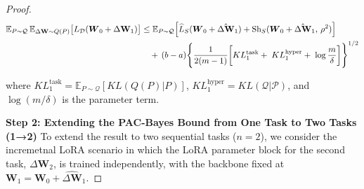 \documentclass[letterpaper]{article} %
\begin{document}
\begin{proof}

\begin{align}
 \mathbb{E}_{P \sim \mathcal{Q}}\, \mathbb{E}_{\Delta\mathbf{W} \sim Q(P)} 
    \big[ L_{\mathcal{D}}(\boldsymbol{W}_0 + \Delta\mathbf{W}_1) \big] \notag 
&\leq \mathbb{E}_{P \sim \mathcal{Q}} \Big[
        \widehat{L}_S(\boldsymbol{W}_0 + \hat{\Delta\mathbf{W}}_1)
        + \mathrm{Sh}_S(\boldsymbol{W}_0 + \hat{\Delta\mathbf{W}}_1,\, \rho^2)
    \Big] \notag \\
&\quad +\, (b-a) \Bigg\{
        \frac{1}{2(m-1)} \bigg[
            KL^{\text{task}}_1
            +\; KL^{\text{hyper}}_1
            +\; \log\frac{m}{\delta}
        \bigg]
    \Bigg\}^{1/2}
\label{eq:single-task-pac-bayes}
\end{align}



where $KL^{\text{task}}_1 = \mathbb{E}_{P \sim \mathcal{Q}}\left[ KL(Q(P)|P) \right]$,
$KL^{\text{hyper}}_1 = KL(\mathcal{Q}|\mathcal{P})$,
and $\log(m/\delta)$ is the parameter term.


\textbf{Step 2: Extending the PAC-Bayes Bound from One Task to Two Tasks  (1→2)}
To extend the result to two sequential tasks ($n=2$), we consider the incremetnal LoRA scenario in which the LoRA parameter block for the second task, $\Delta\mathbf{W}_2$, is trained independently, with the backbone fixed at $\mathbf{W}_1 = \mathbf{W}_0 + \hat{\Delta\mathbf{W}}_1$. 



\end{proof}
\end{document}
